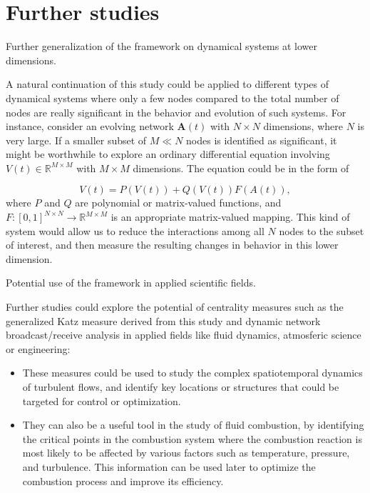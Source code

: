 
\chapter{Further studies}
\label{chap:further}

\begin{highlightedParagraphC}
 
Further generalization of the framework on dynamical systems at lower dimensions.

\end{highlightedParagraphC}

A natural continuation of this study could be applied to different types of dynamical systems where only a few nodes compared to the total number of nodes are really significant in the behavior and evolution of such systems. For instance, consider an evolving network $\mathbf{A}(t)$ with $N \times N$ dimensions, where $N$ is very large. If a smaller subset of $M\ll N$ nodes is identified as significant, it might be worthwhile to explore an ordinary differential equation involving $V(t)\in \mathbb{R}^{M\times M}$ with $M\times M$ dimensions. The equation could be in the form of 

$$V(t)=P(V(t)) + Q(V(t))F(A(t)),$$ where $P$ and $Q$ are polynomial or matrix-valued functions, and $F: [0, 1]^{N×N} \to \mathbb{R}^{M\times M}$ is an appropriate matrix-valued mapping. This kind of system would allow us to reduce the interactions among all $N$ nodes to the subset of interest, and then measure the resulting changes in behavior in this lower dimension.

\begin{highlightedParagraphC}
 
Potential use of the framework in applied scientific fields.

\end{highlightedParagraphC}

Further studies could explore the potential of centrality measures such as the generalized Katz measure derived from this study and dynamic network broadcast/receive analysis in applied fields like fluid dynamics, atmosferic science or engineering: 

\begin{itemize}
  \item These measures could be used to study the complex spatiotemporal dynamics of turbulent flows, and identify key locations or structures that could be targeted for control or optimization. 
  \item They can also be a useful tool in the study of fluid combustion, by identifying the critical points in the combustion system where the combustion reaction is most likely to be affected by various factors such as temperature, pressure, and turbulence. This information can be used later to optimize the combustion process and improve its efficiency.
\end{itemize}
	
